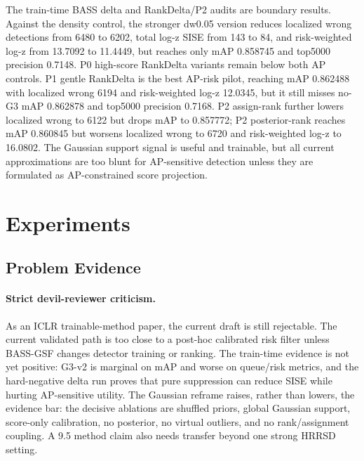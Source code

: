 \documentclass[10pt]{article}
\begin{document}
The train-time BASS delta and RankDelta/P2 audits are boundary results.
Against the density control, the stronger dw0.05 version reduces localized
wrong detections from 6480 to 6202, total log-z SISE from 143 to 84, and
risk-weighted log-z from 13.7092 to 11.4449, but reaches only mAP 0.858745 and
top5000 precision 0.7148.  P0 high-score RankDelta variants remain below both
AP controls.  P1 gentle RankDelta is the best AP-risk pilot, reaching mAP
0.862488 with localized wrong 6194 and risk-weighted log-z 12.0345, but it
still misses no-G3 mAP 0.862878 and top5000 precision 0.7168.  P2 assign-rank
further lowers localized wrong to 6122 but drops mAP to 0.857772; P2
posterior-rank reaches mAP 0.860845 but worsens localized wrong to 6720 and
risk-weighted log-z to 16.0802.  The Gaussian support signal is useful and
trainable, but all current approximations are too blunt for AP-sensitive
detection unless they are formulated as AP-constrained score projection.

\section{Experiments}

\subsection{Problem Evidence}

\paragraph{Strict devil-reviewer criticism.}
As an ICLR trainable-method paper, the current draft is still rejectable.  The
current validated path is too close to a post-hoc calibrated risk filter unless
BASS-GSF changes detector training or ranking.  The train-time evidence is not
yet positive: G3-v2 is marginal on mAP and worse on queue/risk metrics, and the
hard-negative delta run proves that pure suppression can reduce SISE while
hurting AP-sensitive utility.  The Gaussian reframe raises, rather than lowers,
the evidence bar: the decisive ablations are shuffled priors, global Gaussian
support, score-only calibration, no posterior, no virtual outliers, and no
rank/assignment coupling.  A 9.5 method claim also needs transfer beyond one
strong HRRSD setting.
\end{document}
